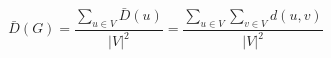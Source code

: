 \documentclass[12pt]{article}
\begin{document}
\[
\bar{D}\left(G\right)
    = \frac
        {\displaystyle\sum_{u \in V}{\bar{D}\left(u\right)}}
        {\left|V\right|^2}
    = \frac
        {\displaystyle\sum_{u \in V}\sum_{v \in V}{d\left(u,v\right)}}
        {\left|V\right|^2}
\]
\end{document}
